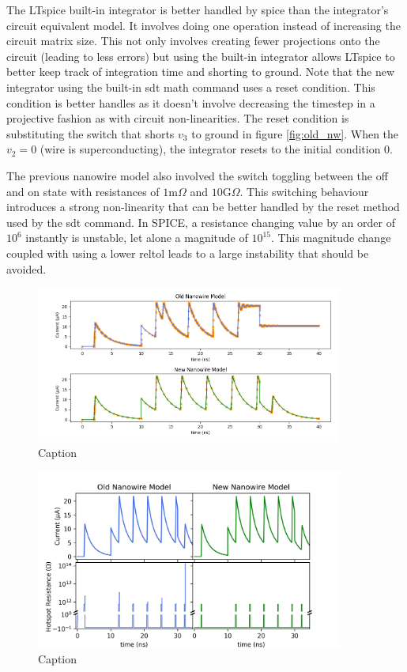\documentclass[]{article}
\newcommand{\cf}[1]{\textsf{#1}}
\begin{document}
The LTspice built-in integrator is better handled
by spice than the integrator's circuit equivalent model.
It involves doing one operation instead of increasing the circuit
matrix size. 
This not only involves creating fewer projections onto the circuit (leading to less errors)
but using the built-in integrator allows LTspice to better keep track of integration
time and shorting to ground. Note that the new integrator using the built-in
\cf{sdt} math command uses a reset condition. This condition is better handles as it
doesn't involve decreasing the timestep in a projective fashion as with circuit
non-linearities. The reset condition is substituting the switch that shorts $v_3$
to ground in figure \ref{fig:old_nw}. When the $v_2=0$ (wire is superconducting),
the integrator resets to the initial condition $0$.

The previous nanowire model also involved the switch toggling between the off and on
state with resistances of $1$m$\Omega$ and $10$G$\Omega$. This switching behaviour
introduces a strong non-linearity that can be better handled by the reset method
used by the \cf{sdt} command. In SPICE, a resistance changing value by an order of
$10^6$ instantly is unstable, let alone a magnitude of $10^{15}$. This magnitude
change coupled with using a lower \cf{reltol} leads to a large instability that
should be avoided.

\begin{figure}
    \centering
    \includegraphics[width=0.9\textwidth]{figs/int_improvement_1e-3.png}
    \caption{Caption}
    \label{fig:int_improvement_1e-3}
\end{figure}

\begin{figure}
    \centering
    \includegraphics[width=0.9\textwidth]{figs/int_improvement_1e-6.png}
    \caption{Caption}
    \label{fig:int_improvement_1e-6}
\end{figure}
\end{document}

